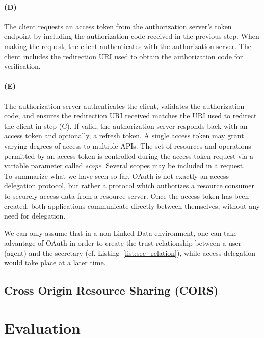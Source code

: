 \documentclass[a4paper]{llncs}
\begin{document}
\paragraph*{(D)} The client requests an access token from the authorization server's token endpoint by including the authorization code received in the previous step. When making the request, the client authenticates with the authorization server. The client includes the redirection URI used to obtain the authorization code for verification.

\paragraph*{(E)} The authorization server authenticates the client, validates the authorization code, and ensures the redirection URI received matches the URI used to redirect the client in step (C). If valid, the authorization server responds back with an access token and optionally, a refresh token. A single access token may grant varying degrees of access to multiple APIs. The set of resources and operations permitted by an access token is controlled during the access token request via a variable parameter called \textit{scope}. Several scopes may be included in a request.\\

To summarize what we have seen so far, OAuth is not exactly an access delegation protocol, but rather a protocol which authorizes a resource consumer to securely access data from a resource server. Once the access token has been created, both applications communicate directly between themselves, without any need for delegation.

We can only assume that in a non-Linked Data environment, one can take advantage of OAuth in order to create the trust relationship between a user (agent) and the secretary (cf. Listing~\ref{list:sec_relation}), while access delegation would take place at a later time.



\subsection{Cross Origin Resource Sharing (CORS)}


\section{Evaluation}\label{sec:eval}





\end{document}
